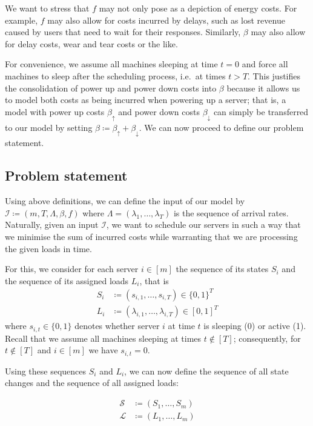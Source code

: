 \documentclass[hidelinks]{article}
\theoremstyle{plain}
\theoremstyle{definition}
\theoremstyle{rem}
\newcommand{\inp}{\mathcal{I}}
\begin{document}
We want to stress that $f$ may not only pose as a depiction of energy costs. For example, $f$ may also allow for costs incurred by delays, such as lost revenue caused by users that need to wait for their responses. Similarly, $\beta$ may also allow for delay costs, wear and tear costs or the like.\cite{dyn_right_size}

For convenience, we assume all machines sleeping at time $t=0$ and force all machines to sleep after the scheduling process, i.e.\ at times $t>T$. This justifies the consolidation of power up and power down costs into $\beta$ because it allows us to model both costs as being incurred when powering up a server; that is, a model with power up costs $\beta_\uparrow$ and power down costs $\beta_\downarrow$ can simply be transferred to our model by setting $\beta\coloneqq \beta_\uparrow+\beta_\downarrow$.  
We can now proceed to define our problem statement.

\subsection{Problem statement}
Using above definitions, we can define the input of our model by $\inp\coloneqq(m,T,\Lambda,\beta,f)$ where $\Lambda=(\lambda_1,\ldots,\lambda_T)$ is the sequence of arrival rates. Naturally, given an input $\inp$, we want to schedule our servers in such a way that we minimise the sum of incurred costs while warranting that we are processing the given loads in time. 

For this, we consider for each server $i\in[m]$ the sequence of its states $S_i$ and the sequence of its assigned loads $L_i$, that is
\begin{align*}
	S_i&\coloneqq(s_{i,1},\ldots,s_{i,T})\in\{0,1\}^T\\
	L_i&\coloneqq(\lambda_{i,1},\ldots,\lambda_{i,T})\in[0,1]^T
\end{align*}
where $s_{i,t}\in\{0,1\}$ denotes whether server $i$ at time $t$ is sleeping (0) or active (1). Recall that we assume all machines sleeping at times $t\notin[T]$; consequently, for $t\notin[T]$ and $i\in[m]$ we have $s_{i,t}=0$.

Using these sequences $S_i$ and $L_i$, we can now define the sequence of all state changes and the sequence of all assigned loads: 

\begin{align*}
	\mathcal{S}&\coloneqq(S_1,\ldots,S_m)\\
	\mathcal{L}&\coloneqq(L_1,\ldots,L_m)
\end{align*}
\end{document}
